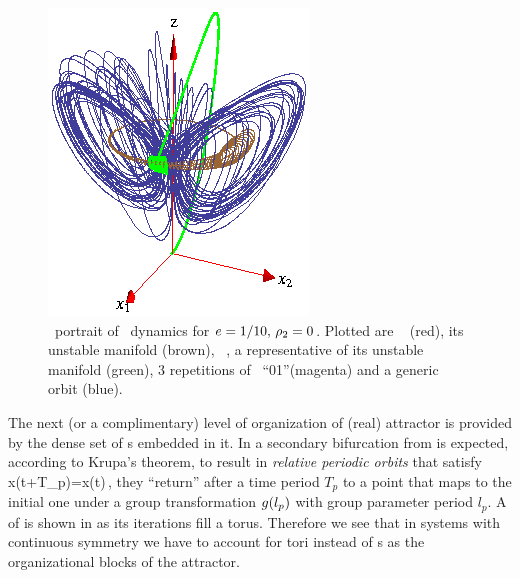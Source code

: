 %
\begin{figure}[ht]
\begin{center}
  \includegraphics[height=0.25\textheight]{../figs/CLE}
\end{center}
\caption[Complex Lorenz flow phase space]
{ \Statesp\ portrait of \CLe\ dynamics for $e=1/10,\,
\rho_2=0$. Plotted are \reqv\  (red), its unstable
manifold (brown), \eqv\ , a representative of its
unstable manifold (green), 3 repetitions of \rpo\
``01''(magenta) and a generic orbit (blue).}
\label{fig:CLE}
\end{figure}
%


The next (or a complimentary) level of organization of (real) {\Le} attractor
is provided by the dense set of \po s embedded in it\rf{DV03,DasBuch}. In {\CLe}
a secondary bifurcation from \REQB{1} is expected, according
to Krupa's theorem, to result in
\emph{relative periodic orbits} that satisfy
\beq
	x(t+T_p)=x(t)\,,
\eeq
{\ie} they ``return'' after a time period $T_p$ to a point that maps to the initial one
under a group transformation $g(l_p)$ with group parameter period $l_p$.
A {\rpo} of {\CLe} is shown in \reffig{fig:CLE} as its iterations fill a torus. Therefore
we see that in systems with continuous symmetry we have to account for tori instead of {\po s}
as the organizational blocks of the attractor. 

\subsection{{\CLe} \reqva}


